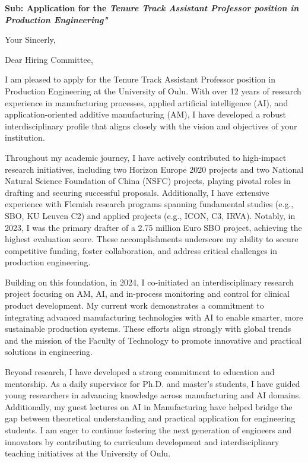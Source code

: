 \documentclass[10pt,a4paper,roman]{moderncv}
\newcommand{\jobTitle}{\textbf{\textit{Tenure Track Assistant Professor position in Production Engineering"
}}}
\newcommand{\jobInstitution}{\textit{University of Oulu}}
\begin{document}
\recipient{To}{\jobInstitution
    }

\date{\today}
\opening{\textbf{Sub: Application for the \jobTitle}}
\closing{Your Sincerly, \vspace{-1em}}

\makelettertitle
Dear Hiring Committee,

I am pleased to apply for the Tenure Track Assistant Professor position in Production Engineering at the University of Oulu. With over 12 years of research experience in manufacturing processes, applied artificial intelligence (AI), and application-oriented additive manufacturing (AM), I have developed a robust interdisciplinary profile that aligns closely with the vision and objectives of your institution.

Throughout my academic journey, I have actively contributed to high-impact research initiatives, including two Horizon Europe 2020 projects and two National Natural Science Foundation of China (NSFC) projects, playing pivotal roles in drafting and securing successful proposals. Additionally, I have extensive experience with Flemish research programs spanning fundamental studies (e.g., SBO, KU Leuven C2) and applied projects (e.g., ICON, C3, IRVA). Notably, in 2023, I was the primary drafter of a 2.75 million Euro SBO project, achieving the highest evaluation score. These accomplishments underscore my ability to secure competitive funding, foster collaboration, and address critical challenges in production engineering.

Building on this foundation, in 2024, I co-initiated an interdisciplinary research project focusing on AM, AI, and in-process monitoring and control for clinical product development. My current work demonstrates a commitment to integrating advanced manufacturing technologies with AI to enable smarter, more sustainable production systems. These efforts align strongly with global trends and the mission of the Faculty of Technology to promote innovative and practical solutions in engineering.

Beyond research, I have developed a strong commitment to education and mentorship. As a daily supervisor for Ph.D. and master’s students, I have guided young researchers in advancing knowledge across manufacturing and AI domains. Additionally, my guest lectures on AI in Manufacturing have helped bridge the gap between theoretical understanding and practical application for engineering students. I am eager to continue fostering the next generation of engineers and innovators by contributing to curriculum development and interdisciplinary teaching initiatives at the University of Oulu.
\end{document}
